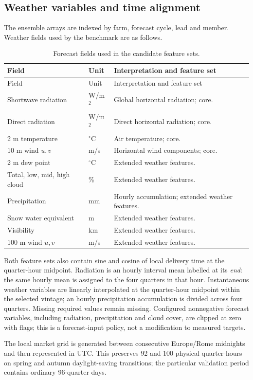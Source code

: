 \documentclass[11pt,a4paper]{article}
\begin{document}
\subsection{Weather variables and time alignment}
The ensemble arrays are indexed by farm, forecast cycle, lead and member. Weather fields used by the benchmark are as follows.
\begin{longtable}{p{4.6cm}p{2.2cm}p{6.8cm}}
\caption{Forecast fields used in the candidate feature sets.}\label{tab:features}\\
\toprule Field & Unit & Interpretation and feature set\\\midrule\endfirsthead
\toprule Field & Unit & Interpretation and feature set\\\midrule\endhead
Shortwave radiation & W/m$^2$ & Global horizontal radiation; core.\\
Direct radiation & W/m$^2$ & Direct horizontal radiation; core.\\
2 m temperature & $^\circ$C & Air temperature; core.\\
10 m wind $u,v$ & m/s & Horizontal wind components; core.\\
2 m dew point & $^\circ$C & Extended weather features.\\
Total, low, mid, high cloud & \% & Extended weather features.\\
Precipitation & mm & Hourly accumulation; extended weather features.\\
Snow water equivalent & m & Extended weather features.\\
Visibility & km & Extended weather features.\\
100 m wind $u,v$ & m/s & Extended weather features.\\
\bottomrule\end{longtable}
Both feature sets also contain sine and cosine of local delivery time at the quarter-hour midpoint. Radiation is an hourly interval mean labelled at its \emph{end}: the same hourly mean is assigned to the four quarters in that hour. Instantaneous weather variables are linearly interpolated at the quarter-hour midpoint within the selected vintage; an hourly precipitation accumulation is divided across four quarters. Missing required values remain missing. Configured nonnegative forecast variables, including radiation, precipitation and cloud cover, are clipped at zero with flags; this is a forecast-input policy, not a modification to measured targets.

The local market grid is generated between consecutive Europe/Rome midnights and then represented in UTC. This preserves 92 and 100 physical quarter-hours on spring and autumn daylight-saving transitions; the particular validation period contains ordinary 96-quarter days.
\end{document}
